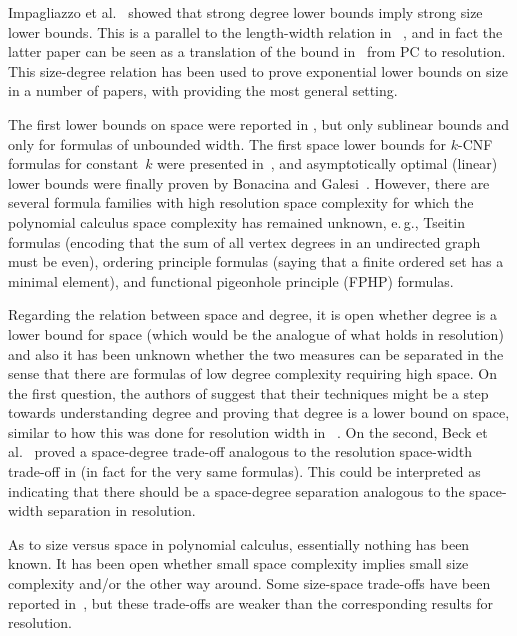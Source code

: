 \documentclass[11pt]{article}
\makeatletter
\numberwithin{equation}{section}
\theoremstyle{definition}
\theoremstyle{plain}
\newcommand{\eg}{e.\,g.}
\theoremstyle{plain}
\theoremstyle{definition}
\newcommand{\etal}{et al.\@\xspace}
\makeatother
\begin{document}
Impagliazzo \etal~\cite{IPS99LowerBounds}
showed that strong degree lower bounds imply strong size lower bounds.
This is a parallel to the length-width relation 
%
in~%
\cite{BW01ShortProofs},
and in fact the latter paper can be seen as a 
translation of   the bound in~%
\cite{IPS99LowerBounds} from
PC 
%
to resolution.
This size-degree relation has been used to prove exponential lower
bounds on  size in a number of papers, with
%
\cite{AR03LowerBounds,MN15GeneralizedMethodDegree}
%
providing the most general setting.

The first lower bounds on space were reported in
\cite{ABRW02SpaceComplexity},
but only sublinear bounds and only for
formulas of unbounded width. The first space lower bounds for
\mbox{$k$-CNF} formulas
%
%
for constant~$k$ were presented in~\cite{FLNRT15SpaceCplx},
and asymptotically optimal (linear) lower bounds
were finally proven by
Bonacina and Galesi~\cite{BG15Framework}.
However, there are several formula families with high resolution space complexity
for which the 
%
polynomial calculus   
space complexity has remained unknown,
%
\eg,     %
Tseitin formulas (encoding
%
that the sum of all vertex
degrees in an undirected graph must be even), 
ordering principle formulas
%
(saying that a finite ordered set has a minimal element),
and 
%
functional pigeonhole principle (FPHP) formulas.

Regarding the relation between space and degree, it is open whether
degree is a lower bound for space 
(which would be the analogue of what holds in resolution)
and also it has been unknown whether the two
measures can be separated in the sense that there are formulas of low
degree complexity requiring high space.
%
On the first question, the authors of \cite{BG15Framework} suggest
that their techniques might be a step towards understanding degree and
proving that degree %
is a lower bound on  %
space, similar to how this was done
for resolution width in~%
\cite{AD08CombinatoricalCharacterization}.
%
On the second, Beck \etal~\cite{BNT13SomeTradeoffs} proved a
space-degree trade-off analogous to the resolution space-width
trade-off in \cite{Ben-Sasson09SizeSpaceTradeoffs} (in fact for the
very same formulas).  This
%
could be interpreted as indicating that there should be a space-degree
separation analogous to the space-width separation in resolution.


As to size versus space in 
%
polynomial calculus,   
essentially nothing has been known.
It 
%
has been 
open whether small space complexity implies small size
complexity and/or the other way around.
Some size-space trade-offs 
%
%
have been
reported in~\cite{BNT13SomeTradeoffs,HN12VirtueSuccinctProofs},
but these trade-offs are weaker than the corresponding results for
resolution. 
\end{document}
